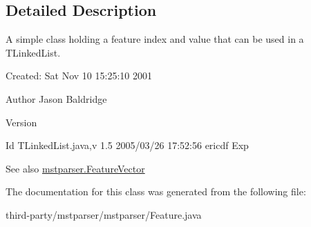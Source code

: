 \subsection{Detailed Description}
A simple class holding a feature index and value that can be used in a TLinkedList.

Created: Sat Nov 10 15:25:10 2001 

\begin{DoxyAuthor}{Author}
Jason Baldridge 
\end{DoxyAuthor}
\begin{DoxyVersion}{Version}

\end{DoxyVersion}
\begin{DoxyParagraph}{Id}
TLinkedList.java,v 1.5 2005/03/26 17:52:56 ericdf Exp 
\end{DoxyParagraph}
\begin{DoxySeeAlso}{See also}
\hyperlink{classmstparser_1_1FeatureVector}{mstparser.FeatureVector} 
\end{DoxySeeAlso}


The documentation for this class was generated from the following file:\begin{DoxyCompactItemize}
\item 
third-\/party/mstparser/mstparser/Feature.java\end{DoxyCompactItemize}
